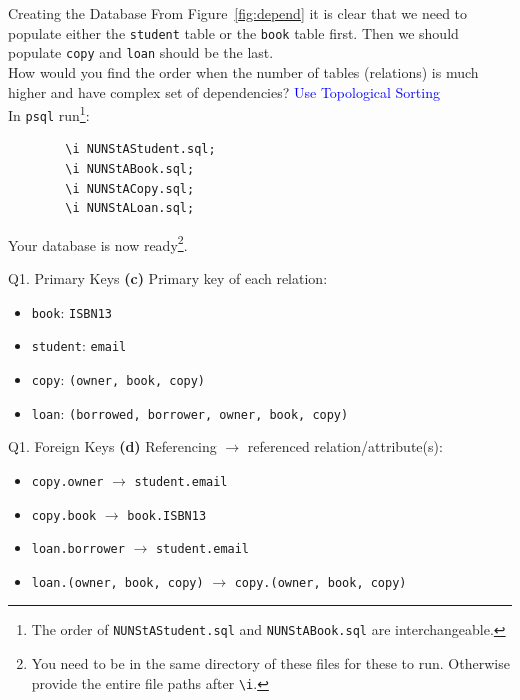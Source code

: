 \documentclass{beamer}
\begin{document}
\begin{frame}[fragile]{Creating the Database}
    From Figure~\ref{fig:depend} it is clear that we need to populate either the \texttt{student} table or the \texttt{book} table first. Then we should populate \texttt{copy} and \texttt{loan} should be the last. \\
    \pause
    \scriptsize
    \alert{How would you find the order when the number of tables (relations) is much higher and have complex set of dependencies?} \pause \textcolor{blue}{Use Topological Sorting}\\
    \pause
    \normalsize
    In \texttt{psql} run\footnote{The order of \texttt{NUNStAStudent.sql} and \texttt{NUNStABook.sql} are interchangeable.}:
    \begin{lstlisting}
        \i NUNStAStudent.sql;
        \i NUNStABook.sql;
        \i NUNStACopy.sql;
        \i NUNStALoan.sql;
    \end{lstlisting}
Your database is now ready\footnote{You need to be in the same directory of these files for these to run. Otherwise provide the entire file paths after \texttt{\textbackslash i}.}.\\
\end{frame}

\begin{frame}{Q1. Primary Keys}
\textbf{(c)} Primary key of each relation:
\begin{itemize}
  \item \texttt{book}: \texttt{ISBN13}
  \item \texttt{student}: \texttt{email}
  \item \texttt{copy}: \texttt{(owner, book, copy)}
  \item \texttt{loan}: \texttt{(borrowed, borrower, owner, book, copy)}
\end{itemize}
\end{frame}

\begin{frame}{Q1. Foreign Keys}
\textbf{(d)} Referencing $\to$ referenced relation/attribute(s):
\begin{itemize}
  \item \texttt{copy.owner} $\to$ \texttt{student.email}
  \item \texttt{copy.book} $\to$ \texttt{book.ISBN13}
  \item \texttt{loan.borrower} $\to$ \texttt{student.email}
  \item \texttt{loan.(owner, book, copy)} $\to$ \texttt{copy.(owner, book, copy)}
\end{itemize}
\end{frame}
\end{document}
